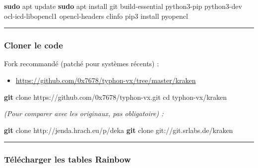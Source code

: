\documentclass[
  french,
]{article}
\newenvironment{Shaded}{\begin{snugshade}}{\end{snugshade}}
\newcommand{\BuiltInTok}[1]{#1}
\newcommand{\ExtensionTok}[1]{#1}
\newcommand{\FunctionTok}[1]{\textcolor[rgb]{0.13,0.29,0.53}{\textbf{#1}}}
\newcommand{\NormalTok}[1]{#1}
\providecommand{\tightlist}{%
  \setlength{\itemsep}{0pt}\setlength{\parskip}{0pt}}
\begin{document}
\begin{Shaded}
\begin{Highlighting}[]
\FunctionTok{sudo}\NormalTok{ apt update}
\FunctionTok{sudo}\NormalTok{ apt install git build{-}essential python3{-}pip python3{-}dev ocl{-}icd{-}libopencl1 opencl{-}headers clinfo}
\ExtensionTok{pip3}\NormalTok{ install pyopencl}
\end{Highlighting}
\end{Shaded}

\begin{center}\rule{0.5\linewidth}{0.5pt}\end{center}

\subsubsection{Cloner le code}\label{cloner-le-code}

Fork recommandé (patché pour systèmes récents) :

\begin{itemize}
\tightlist
\item
  \url{https://github.com/0x7678/typhon-vx/tree/master/kraken}
\end{itemize}

\begin{Shaded}
\begin{Highlighting}[]
\FunctionTok{git}\NormalTok{ clone https://github.com/0x7678/typhon{-}vx.git}
\BuiltInTok{cd}\NormalTok{ typhon{-}vx/kraken}
\end{Highlighting}
\end{Shaded}

\emph{(Pour comparer avec les originaux, pas obligatoire) :}

\begin{Shaded}
\begin{Highlighting}[]
\FunctionTok{git}\NormalTok{ clone http://jenda.hrach.eu/p/deka}
\FunctionTok{git}\NormalTok{ clone git://git.srlabs.de/kraken}
\end{Highlighting}
\end{Shaded}

\begin{center}\rule{0.5\linewidth}{0.5pt}\end{center}

\subsubsection{Télécharger les tables
Rainbow}\label{tuxe9luxe9charger-les-tables-rainbow}
\end{document}
